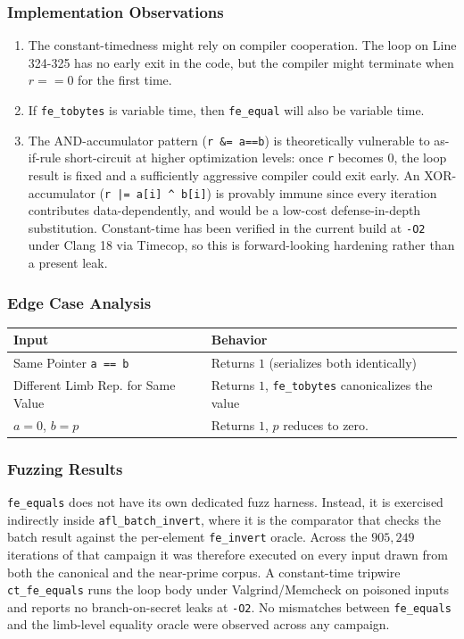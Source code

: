 \documentclass[12pt,titlepage,table]{article}
\begin{document}
\subsubsection{Implementation Observations}
\begin{enumerate}
\item The constant-timedness might rely on compiler cooperation. The loop on Line 324-325 has no early exit in the code, but the compiler might terminate when $r == 0$ for the first time.
\item If \verb+fe_tobytes+ is variable time, then \verb+fe_equal+ will also be variable time.
\item The AND-accumulator pattern (\verb+r &= a==b+) is theoretically vulnerable to as-if-rule short-circuit at higher optimization levels: once \verb+r+ becomes $0$, the loop result is fixed and a sufficiently aggressive compiler could exit early.  An XOR-accumulator (\verb+r |= a[i] ^ b[i]+) is provably immune since every iteration contributes data-dependently, and would be a low-cost defense-in-depth substitution.  Constant-time has been verified in the current build at \verb+-O2+ under Clang 18 via Timecop, so this is forward-looking hardening rather than a present leak.
\end{enumerate}
\subsubsection{Edge Case Analysis}
\begin{table}[htbp]
\centering
{
\begin{tabular}{| l | l |}
\hline
\textbf{Input} & \textbf{Behavior} \\
\hline
\hline
Same Pointer \verb|a == b| & Returns $1$ (serializes both identically) \\
Different Limb Rep. for Same Value & Returns $1$, \verb+fe_tobytes+ canonicalizes the value \\
$a = 0$, $b = p$ & Returns $1$, $p$ reduces to zero. \\
\hline
\end{tabular}}
\end{table}

\subsubsection{Fuzzing Results}
\verb+fe_equals+ does not have its own dedicated fuzz harness.  Instead, it is exercised indirectly inside \verb+afl_batch_invert+, where it is the comparator that checks the batch result against the per-element \verb+fe_invert+ oracle.  Across the $905{,}249$ iterations of that campaign it was therefore executed on every input drawn from both the canonical and the near-prime corpus.  A constant-time tripwire \verb+ct_fe_equals+ runs the loop body under Valgrind/Memcheck on poisoned inputs and reports no branch-on-secret leaks at \verb+-O2+.  No mismatches between \verb+fe_equals+ and the limb-level equality oracle were observed across any campaign.
\end{document}
